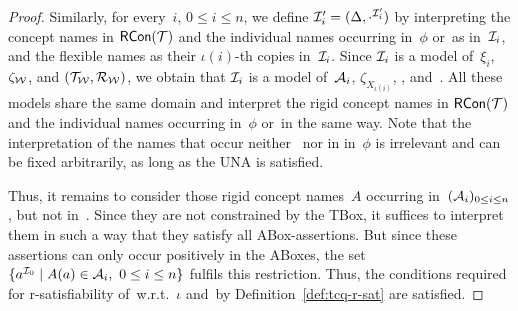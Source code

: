 \begin{proof}
    Similarly, for every~$i$, $0\le i\le n$, we define
    $\mathcal{I}_i'=(\Delta,\cdot^{\mathcal{I}_i'})$ by interpreting the concept names in
    $\operatorname{\mathsf{RCon}}(\mathcal{T})$ and the individual names occurring in~$\phi$ or~\Kmc as
    in~$\mathcal{I}_i$, and the flexible names as their $\iota(i)$-th copies
    in~$\mathcal{I}_i$.  Since $\mathcal{I}_i$ is a model of~$\xi_i$, $\zeta_\mathcal{W}$, and
    $(\mathcal{T}_\mathcal{W},\mathcal{R}_\mathcal{W})$, we obtain that $\mathcal{I}_i$ is a model of~$\mathcal{A}_i$,
    $\zeta_{X_{\iota(i)}}$, \Tmc, and~\Rmc.
    All these models share the same domain and interpret the rigid concept names
    in $\operatorname{\mathsf{RCon}}(\mathcal{T})$ and the individual names occurring in~$\phi$ or~\Kmc in the
    same way.  Note that the interpretation of the names that occur neither~\Kmc
    nor in in~$\phi$ is irrelevant and can be fixed arbitrarily, as long as the
    UNA is satisfied.

    Thus, it remains to consider those rigid concept names~$A$ occurring
    in~$(\mathcal{A}_i)_{0\le i\le n}$, but not in~\Tmc.  Since they are not
    constrained by the TBox, it suffices to interpret them in such a way that
    they satisfy all ABox-assertions.  But since these assertions can only occur
    positively in the ABoxes, the set
    $\{a^{\mathcal{I}_0}\mid A(a)\in\mathcal{A}_i,\ 0\le i\le n\}$ fulfils this restriction.
    Thus, the conditions required for r-satisfiability of~\Wmc w.r.t.~$\iota$
    and~\Kmc by Definition~\ref{def:tcq-r-sat} are satisfied.


\end{proof}
